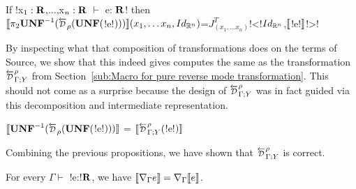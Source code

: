 \begin{proposition}
    If !x$_1:\mathbf{R}$,$\ldots$,x$_n:\mathbf{R}$ $\vdash$ e: $\mathbf{R}$! then \\
    $\seml \pi_2 \UNFSymbol^{-1}(\Dsynrevsymbol_{\rho}(\UNFSymbol($!e!$)))\rrbracket(x_1,\ldots x_n,Id_{\mathbb{R}^n})$=$J^T_{(x_1,\ldots x_n)}$!<!$Id_{\mathbb{R}^n}$,$\llbracket$!e!$\rrbracket$!>!
\end{proposition}

By inspecting what that composition of transformations does on the terms of Source, 
we show that this indeed gives computes the same as the transformation 
$\directD{\rho}{\Gamma}{Y}$ from Section~\ref{sub:Macro for pure reverse mode transformation}. 
This should not come as a surprise because the design of $\directD{\rho}{\Gamma}{Y}$ was in fact guided via 
this decomposition and intermediate representation.

\begin{proposition}
    $\seml\UNFSymbol^{-1}(\Dsynrevsymbol_{\rho}(\UNFSymbol($!e!$)))\rrbracket$ = $\seml\directD{\rho}{\Gamma}{Y}($!e!$)\rrbracket$ 
\end{proposition}

Combining the previous propositions, we have shown that $\directD{\rho}{\Gamma}{Y}$ is correct.

\begin{theorem}
    For every $\Gamma \vdash$ !e:!$\mathbf{R}$, we have 
    $\llbracket \nabla_\Gamma e\rrbracket= \nabla_\Gamma\llbracket e\rrbracket$.
\end{theorem}